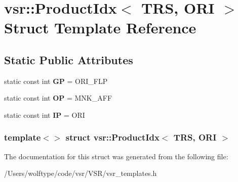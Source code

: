 \hypertarget{structvsr_1_1_product_idx_3_01_t_r_s_00_01_o_r_i_01_4}{\section{vsr\-:\-:Product\-Idx$<$ T\-R\-S, O\-R\-I $>$ Struct Template Reference}
\label{structvsr_1_1_product_idx_3_01_t_r_s_00_01_o_r_i_01_4}
}
\subsection*{Static Public Attributes}
\begin{DoxyCompactItemize}
\item 
\hypertarget{structvsr_1_1_product_idx_3_01_t_r_s_00_01_o_r_i_01_4_a1e6c2246d072c4991b814d856ab3344b}{static const int {\bfseries G\-P} = O\-R\-I\-\_\-\-F\-L\-P}\label{structvsr_1_1_product_idx_3_01_t_r_s_00_01_o_r_i_01_4_a1e6c2246d072c4991b814d856ab3344b}

\item 
\hypertarget{structvsr_1_1_product_idx_3_01_t_r_s_00_01_o_r_i_01_4_a464744a69659e8a0ca15570650d9c03f}{static const int {\bfseries O\-P} = M\-N\-K\-\_\-\-A\-F\-F}\label{structvsr_1_1_product_idx_3_01_t_r_s_00_01_o_r_i_01_4_a464744a69659e8a0ca15570650d9c03f}

\item 
\hypertarget{structvsr_1_1_product_idx_3_01_t_r_s_00_01_o_r_i_01_4_ae8996f5a0695087d924e8a3700f5062f}{static const int {\bfseries I\-P} = O\-R\-I}\label{structvsr_1_1_product_idx_3_01_t_r_s_00_01_o_r_i_01_4_ae8996f5a0695087d924e8a3700f5062f}

\end{DoxyCompactItemize}
\subsubsection*{template$<$$>$ struct vsr\-::\-Product\-Idx$<$ T\-R\-S, O\-R\-I $>$}



The documentation for this struct was generated from the following file\-:\begin{DoxyCompactItemize}
\item 
/\-Users/wolftype/code/vsr/\-V\-S\-R/vsr\-\_\-templates.\-h\end{DoxyCompactItemize}
